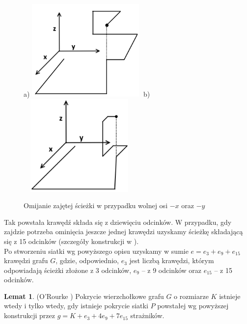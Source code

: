 \documentclass[brudnopis]{xmgr}
\theoremstyle{definition}
\newtheorem{Lemat}{Lemat}
\begin{document}
\begin{figure}[ht!]
  \centering
  a)\includegraphics[width=6cm,height=5cm]{rysunki/zajete_z.png}
  b)\includegraphics[width=6cm,height=5cm]{rysunki/zajete_z2.png}
  \caption{Omijanie zajętej ścieżki w przypadku wolnej osi $-x$ oraz $-y$}
  \label{fig:nakladanie}
\end{figure} 

Tak powstała krawędź składa się z dziewięciu odcinków. W przypadku, gdy zajdzie potrzeba ominięcia jeszcze jednej krawędzi uzyskamy ścieżkę składającą się z 15 odcinków (szczegóły konstrukcji w \cite{ntafos} ).
\\\indent Po stworzeniu siatki wg powyższego opisu uzyskamy w sumie $e = e_3 + e_9 + e_{15}$ krawędzi grafu $G$, gdzie, odpowiednio, $e_3$  jest liczbą krawędzi, którym odpowiadają ścieżki złożone z 3 odcinków, $e_9$ -- z 9 odcinków oraz $e_{15}$ -- z 15 odcinków.

\begin{Lemat} (O'Rourke \cite{orourke})
	Pokrycie wierzchołkowe grafu $G$ o rozmiarze $K$ istnieje wtedy i tylko wtedy, gdy istnieje pokrycie siatki $P$ powstałej wg powyższej konstrukcji przez $g = K + e_3 + 4e_9 + 7e_{15}$ strażników.
\end{Lemat}
\end{document}
